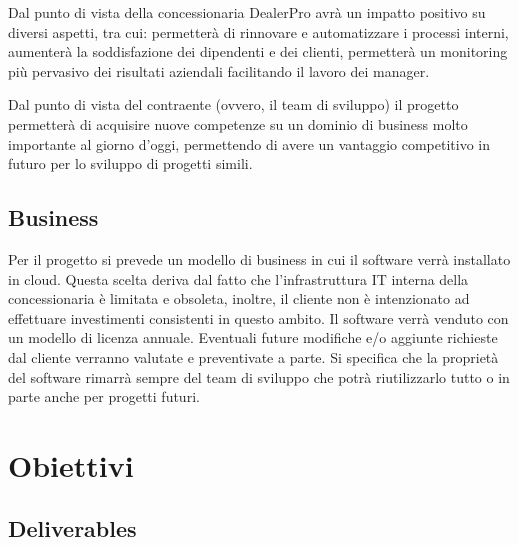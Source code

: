 \documentclass{article}
\begin{document}
  Dal punto di vista della concessionaria DealerPro avrà un impatto positivo su 
    diversi aspetti, tra cui: permetterà di rinnovare e automatizzare i processi
    interni, aumenterà la soddisfazione dei dipendenti e dei clienti, 
    permetterà un monitoring più pervasivo dei risultati aziendali facilitando il 
    lavoro dei manager.

  Dal punto di vista del contraente (ovvero, il team di sviluppo) il progetto 
    permetterà di acquisire nuove competenze su un dominio di business molto importante
    al giorno d'oggi, permettendo di avere un vantaggio competitivo in futuro per lo 
    sviluppo di progetti simili.

  \subsection{Business}
  
  Per il progetto si prevede un modello di business in cui il software verrà installato in cloud. 
    Questa scelta deriva dal fatto che l'infrastruttura IT interna della concessionaria è limitata e obsoleta,
    inoltre, il cliente non è intenzionato ad effettuare investimenti consistenti in questo ambito.
    Il software verrà venduto con un modello di licenza annuale.
    Eventuali future modifiche e/o aggiunte richieste dal cliente verranno valutate e preventivate a parte.
    Si specifica che la proprietà del software rimarrà sempre del team di sviluppo che potrà riutilizzarlo tutto 
    o in parte anche per progetti futuri.



  \newpage
  \section{Obiettivi}

  \subsection{Deliverables}
\end{document}
